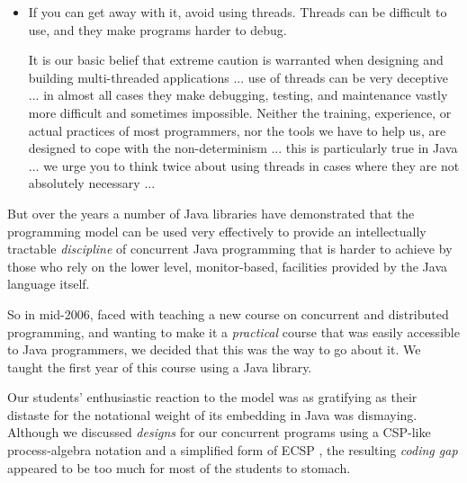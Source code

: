 \documentclass[12pt]{IOS-Book-Article-CPA-2017}
\begin{document}
\begin{itemize}\parskip=\medskipamount\item[]
\begin{it}
If you can get away with it, avoid using threads. Threads can be
difficult to use, and they make programs harder to debug.

It is our basic belief that extreme caution is warranted when
designing and building multi-threaded applications
... use of threads can be very deceptive ...
in almost all cases they make debugging, testing, and maintenance
vastly more difficult and sometimes impossible. Neither the training,
experience, or actual practices of most programmers, nor the tools
we have to help us, are designed to cope with the non-determinism
...  this is particularly true in Java ...  we urge you to think
twice about using threads in cases where they are not absolutely
necessary ...\cite {jfc1}
\end{it}
\end{itemize}

But over the years a number of Java libraries \cite{dearsir,jcsp,jcsp2,ctj,ctjapp}
have demonstrated that the \occam programming model can be used
very effectively to provide an intellectually tractable \textit{discipline}
of concurrent Java programming that is harder to achieve by those
who rely on the lower level, monitor-based, facilities provided by
the Java language itself.

So in mid-2006, faced with teaching a new course on
concurrent and distributed programming, and wanting to make
it a \textit{practical} course that was easily accessible to
Java programmers, we decided that this was the way to go
about it.  We taught the first year of this course using a
Java library.

Our students' enthusiastic reaction to the \occam model was as
gratifying as their distaste for the notational weight of its
embedding in Java was dismaying. 
%
Although we discussed \textit{designs} for our concurrent programs
using a CSP-like process-algebra notation and a simplified form of
ECSP \cite{ecsp,ecspman}, the resulting \textit{coding gap} appeared
to be too much for most of the students to stomach.
\end{document}
